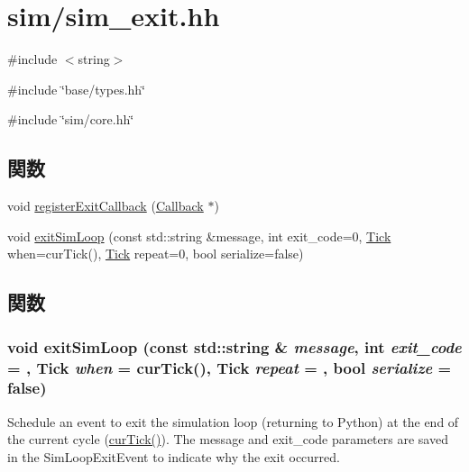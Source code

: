 \hypertarget{sim__exit_8hh}{
\section{sim/sim\_\-exit.hh}
\label{sim__exit_8hh}
}
{\ttfamily \#include $<$string$>$}\par
{\ttfamily \#include \char`\"{}base/types.hh\char`\"{}}\par
{\ttfamily \#include \char`\"{}sim/core.hh\char`\"{}}\par
\subsection*{関数}
\begin{DoxyCompactItemize}
\item 
void \hyperlink{sim__exit_8hh_a3f0ee1af678f20e62971ddc7deed94af}{registerExitCallback} (\hyperlink{classCallback}{Callback} $\ast$)
\item 
void \hyperlink{sim__exit_8hh_a319d29a0c13f7435b886ecac9cae4d23}{exitSimLoop} (const std::string \&message, int exit\_\-code=0, \hyperlink{base_2types_8hh_a5c8ed81b7d238c9083e1037ba6d61643}{Tick} when=curTick(), \hyperlink{base_2types_8hh_a5c8ed81b7d238c9083e1037ba6d61643}{Tick} repeat=0, bool serialize=false)
\end{DoxyCompactItemize}


\subsection{関数}
\hypertarget{sim__exit_8hh_a319d29a0c13f7435b886ecac9cae4d23}{
\subsubsection[{exitSimLoop}]{\setlength{\rightskip}{0pt plus 5cm}void exitSimLoop (const std::string \& {\em message}, \/  int {\em exit\_\-code} = {}, \/  {\bf Tick} {\em when} = {\ttfamily curTick()}, \/  {\bf Tick} {\em repeat} = {}, \/  bool {\em serialize} = {\ttfamily false})}}
\label{sim__exit_8hh_a319d29a0c13f7435b886ecac9cae4d23}
Schedule an event to exit the simulation loop (returning to Python) at the end of the current cycle (\hyperlink{statistics_8hh_a7acdccbf0d35ce0c159c0cdd36371b22}{curTick()}). The message and exit\_\-code parameters are saved in the SimLoopExitEvent to indicate why the exit occurred. 


